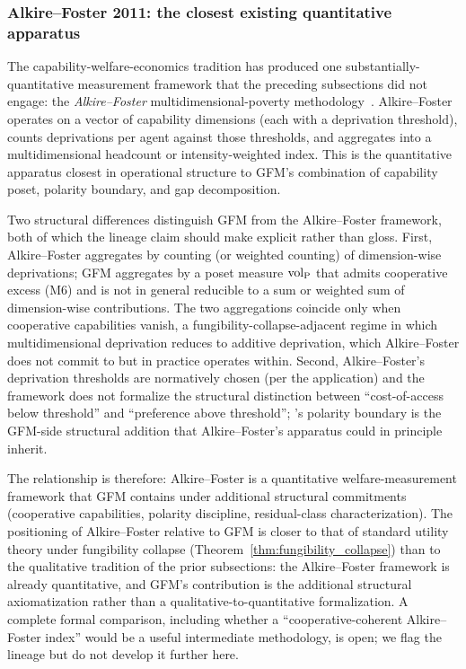 \subsubsection{Alkire--Foster 2011: the closest existing quantitative apparatus}

The capability-welfare-economics tradition has produced one
substantially-quantitative measurement framework that the
preceding subsections did not engage: the
\emph{Alkire--Foster} multidimensional-poverty
methodology~\citep{alkire2011counting}.  Alkire--Foster
operates on a vector of capability dimensions (each with a
deprivation threshold), counts deprivations per agent against
those thresholds, and aggregates into a multidimensional
headcount or intensity-weighted index.  This is the quantitative
apparatus closest in operational structure to GFM's combination
of capability poset, polarity boundary, and gap decomposition.

Two structural differences distinguish GFM from the
Alkire--Foster framework, both of which the lineage claim
should make explicit rather than gloss.  First, Alkire--Foster
aggregates by counting (or weighted counting) of dimension-wise
deprivations; GFM aggregates by a poset measure ${\operatorname{vol}_{\mathrm{P}}}$ that
admits cooperative excess (M6) and is not in general reducible
to a sum or weighted sum of dimension-wise contributions.  The
two aggregations coincide only when cooperative capabilities
vanish, a fungibility-collapse-adjacent regime in which
multidimensional deprivation reduces to additive deprivation,
which Alkire--Foster does not commit to but in practice
operates within.  Second, Alkire--Foster's deprivation
thresholds are normatively chosen (per the application) and the
framework does not formalize the structural distinction between
``cost-of-access below threshold'' and ``preference above
threshold''; \citep[Need~Sufficiency]{lasser2026paper8b}'s
polarity boundary is the GFM-side structural addition that
Alkire--Foster's apparatus could in principle inherit.

The relationship is therefore: Alkire--Foster is a
quantitative welfare-measurement framework that GFM contains
under additional structural commitments (cooperative capabilities,
polarity discipline, residual-class characterization).  The
positioning of Alkire--Foster relative to GFM is closer to that
of standard utility theory under fungibility collapse
(Theorem~\ref{thm:fungibility_collapse}) than to the qualitative
tradition of the prior subsections: the Alkire--Foster framework
is already quantitative, and GFM's contribution is the
additional structural axiomatization rather than a
qualitative-to-quantitative formalization.  A complete formal
comparison, including whether a ``cooperative-coherent
Alkire--Foster index'' would be a useful intermediate
methodology, is open; we flag the lineage but do not develop it
further here.

